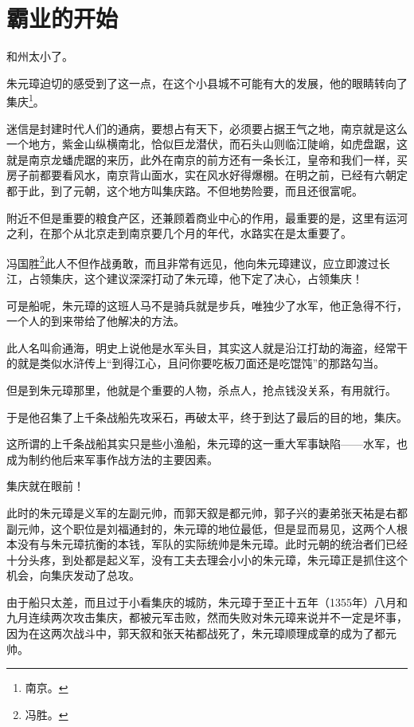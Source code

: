 \section{霸业的开始}
\ifnum{}
	\begin{multicols}{\theparacolNo}
		\fi
		和州太小了。

		朱元璋迫切的感受到了这一点，在这个小县城不可能有大的发展，他的眼睛转向了集庆\footnote{南京。}。

		迷信是封建时代人们的通病，要想占有天下，必须要占据王气之地，南京就是这么一个地方，紫金山纵横南北，恰似巨龙潜伏，而石头山则临江陡峭，如虎盘踞，这就是南京龙蟠虎踞的来历，此外在南京的前方还有一条长江，皇帝和我们一样，买房子前都要看风水，南京背山面水，实在风水好得爆棚。在明之前，已经有六朝定都于此，到了元朝，这个地方叫集庆路。不但地势险要，而且还很富呢。

		附近不但是重要的粮食产区，还兼顾着商业中心的作用，最重要的是，这里有运河之利，在那个从北京走到南京要几个月的年代，水路实在是太重要了。

		冯国胜\footnote{冯胜。}此人不但作战勇敢，而且非常有远见，他向朱元璋建议，应立即渡过长江，占领集庆，这个建议深深打动了朱元璋，他下定了决心，占领集庆！

		可是船呢，朱元璋的这班人马不是骑兵就是步兵，唯独少了水军，他正急得不行，一个人的到来带给了他解决的方法。

		此人名叫俞通海，明史上说他是水军头目，其实这人就是沿江打劫的海盗，经常干的就是类似水浒传上“到得江心，且问你要吃板刀面还是吃馄饨”的那路勾当。

		但是到朱元璋那里，他就是个重要的人物，杀点人，抢点钱没关系，有用就行。

		于是他召集了上千条战船先攻采石，再破太平，终于到达了最后的目的地，集庆。

		这所谓的上千条战船其实只是些小渔船，朱元璋的这一重大军事缺陷——水军，也成为制约他后来军事作战方法的主要因素。

		集庆就在眼前！

		此时的朱元璋是义军的左副元帅，而郭天叙是都元帅，郭子兴的妻弟张天祐是右都副元帅，这个职位是刘福通封的，朱元璋的地位最低，但是显而易见，这两个人根本没有与朱元璋抗衡的本钱，军队的实际统帅是朱元璋。此时元朝的统治者们已经十分头疼，到处都是起义军，没有工夫去理会小小的朱元璋，朱元璋正是抓住这个机会，向集庆发动了总攻。

		由于船只太差，而且过于小看集庆的城防，朱元璋于至正十五年（1355年）八月和九月连续两次攻击集庆，都被元军击败，然而失败对朱元璋来说并不一定是坏事，因为在这两次战斗中，郭天叙和张天祐都战死了，朱元璋顺理成章的成为了都元帅。


\end{multicols}
